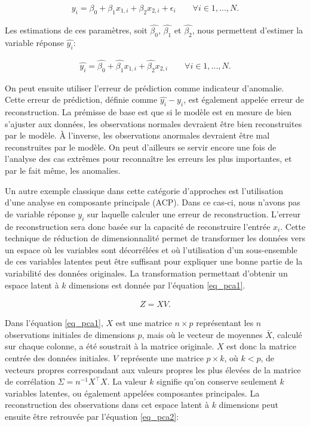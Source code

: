 \begin{gather}  \label{eq_reg}
y_i = \beta_0 + \beta_{1} x_{1,i} + \beta_2 x_{2,i} + \epsilon_{i} \qquad \forall i \in {1,...,N}.
\end{gather}

Les estimations de ces paramètres, soit $\hat{\beta_0}$, $\hat{\beta_1}$ et $\hat{\beta_2}$, nous permettent d'estimer la variable réponse $\hat{y_i}$: 

\begin{gather}  \label{eq_reghat}
\hat{y_i} = \hat{\beta_0} + \hat{\beta_{1}} x_{1,i} + \hat{\beta_2} x_{2,i} \qquad \forall i \in {1,...,N}.
\end{gather}

On peut ensuite utiliser l'erreur de prédiction comme indicateur d'anomalie. Cette erreur de prédiction, définie comme $\hat{y_i} - y_i$, est également appelée erreur de reconstruction. La prémisse de base est que si le modèle est en mesure de bien s'ajuster aux données, les observations normales devraient être bien reconstruites par le modèle. À l'inverse, les observations anormales devraient être mal reconstruites par le modèle.  On peut d'ailleurs se servir encore une fois de l'analyse des cas extrêmes pour reconnaître les erreurs les plus importantes, et par le fait même, les anomalies.
 
Un autre exemple classique dans cette catégorie d'approches est l'utilisation d'une analyse en composante principale (ACP). Dans ce cas-ci, nous n'avons pas de variable réponse $y_i$ sur laquelle calculer une erreur de reconstruction. L'erreur de reconstruction sera donc basée sur la capacité de reconstruire l'entrée $x_i$. Cette technique de réduction de dimensionnalité permet de transformer les données vers un espace où les variables sont décorrélées et où l'utilisation d'un sous-ensemble de ces variables latentes peut être suffisant pour expliquer une bonne partie de la variabilité des données originales. La transformation permettant d'obtenir un espace latent à $k$ dimensions est donnée par l'équation \ref{eq_pca1}.
 
 \begin{gather}  \label{eq_pca1}
 Z = XV.
 \end{gather}
 
Dans l'équation \ref{eq_pca1}, $X$ est une matrice $n \times p$ représentant les $n$  observations initiales de dimensions $p$, mais où le vecteur de moyennes $\bar{X}$, calculé sur chaque colonne, a été soustrait à la matrice originale. $X$ est donc la matrice centrée des données initiales. $V$ représente une matrice $p \times k$, où $k < p$, de  vecteurs propres correspondant aux valeurs propres les plus élevées de la matrice de corrélation $\Sigma = n^{-1}X^\top X$. La valeur $k$ signifie qu'on conserve seulement $k$ variables latentes, ou également appelées composantes principales. La reconstruction des observations dans cet espace latent à $k$ dimensions peut ensuite être retrouvée par l'équation \ref{eq_pca2}:
 
